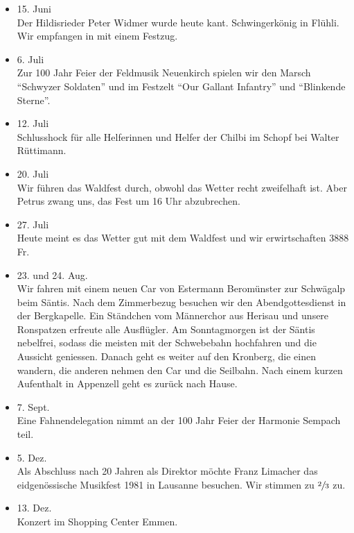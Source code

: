 \begin{history}
\begin{itemize}
        \item[]15. Juni\\
        Der Hildisrieder Peter Widmer wurde heute kant. Schwingerkönig in
        Flühli. Wir empfangen in mit einem Festzug.

        \item[]6. Juli\\
        Zur 100 Jahr Feier der Feldmusik Neuenkirch spielen wir den Marsch
        \enquote{Schwyzer Soldaten} und im Festzelt \enquote{Our Gallant Infantry} und
        \enquote{Blinkende Sterne}.

        \item[]12. Juli\\
        Schlusshock für alle Helferinnen und Helfer der Chilbi im Schopf bei
        Walter Rüttimann.

        \item[]20. Juli\\
        Wir führen das Waldfest durch, obwohl das Wetter recht zweifelhaft ist.
        Aber Petrus zwang uns, das Fest um 16 Uhr abzubrechen.

        \item[]27. Juli\\
        Heute meint es das Wetter gut mit dem Waldfest und wir erwirtschaften
        3888 Fr.

        \item[]23. und 24. Aug.\\
        Wir fahren mit einem neuen Car von Estermann Beromünster zur Schwägalp
        beim Säntis. Nach dem Zimmerbezug besuchen wir den Abendgottesdienst in
        der Bergkapelle. Ein Ständchen vom Männerchor aus Herisau und unsere
        Ronspatzen erfreute alle Ausflügler. Am Sonntagmorgen ist der Säntis
        nebelfrei, sodass die meisten mit der Schwebebahn hochfahren und die
        Aussicht geniessen. Danach geht es weiter auf den Kronberg, die einen
        wandern, die anderen nehmen den Car und die Seilbahn. Nach einem kurzen
        Aufenthalt in Appenzell geht es zurück nach Hause.

        \item[]7. Sept.\\
        Eine Fahnendelegation nimmt an der 100 Jahr Feier der Harmonie Sempach
        teil.

        \item[]5. Dez.\\
        Als Abschluss nach 20 Jahren als Direktor möchte Franz Limacher das
        eidgenössische Musikfest 1981 in Lausanne besuchen. Wir stimmen zu
        $\sfrac{2}{3}$ zu.

        \item[]13. Dez.\\
        Konzert im Shopping Center Emmen.


    \end{itemize}

\end{history}
